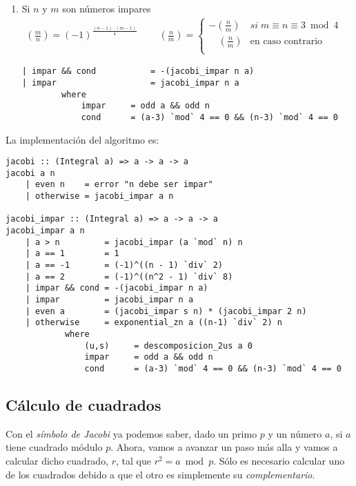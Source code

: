 \documentclass[10pt,spanish]{article}
\begin{document}
\begin{enumerate}[1.]
\begin{verbatim}
| a == 2 = (-1)^((n^2 - 1) `div` 8)
\end{verbatim}

\item Si $n$ y $m$ son números impares
\begin{equation*}
    \begin{aligned}
    \left( \frac{m}{n} \right) = (-1)^{\frac{(n-1)\cdot(m-1)}{4}} \qquad\ \left( \frac{n}{m} \right) = \begin{cases}
        - \left( \frac{n}{m} \right) & si \;m \equiv n \equiv 3 \bmod 4 \\
        \quad\left( \frac{n}{m} \right) & \text{en caso contrario}\\
        \end{cases}
    \end{aligned}
    \phantom{\hspace{18cm}}
\end{equation*}

\begin{verbatim}
| impar && cond           = -(jacobi_impar n a)
| impar                   = jacobi_impar n a
        where
            impar     = odd a && odd n 
            cond      = (a-3) `mod` 4 == 0 && (n-3) `mod` 4 == 0
\end{verbatim}
\end{enumerate}

La implementación del algoritmo es:

\begin{verbatim}
jacobi :: (Integral a) => a -> a -> a
jacobi a n
    | even n    = error "n debe ser impar"
    | otherwise = jacobi_impar a n

jacobi_impar :: (Integral a) => a -> a -> a
jacobi_impar a n
    | a > n         = jacobi_impar (a `mod` n) n
    | a == 1        = 1
    | a == -1       = (-1)^((n - 1) `div` 2)
    | a == 2        = (-1)^((n^2 - 1) `div` 8)
    | impar && cond = -(jacobi_impar n a)
    | impar         = jacobi_impar n a
    | even a        = (jacobi_impar s n) * (jacobi_impar 2 n)
    | otherwise     = exponential_zn a ((n-1) `div` 2) n
            where
                (u,s)     = descomposicion_2us a 0
                impar     = odd a && odd n 
                cond      = (a-3) `mod` 4 == 0 && (n-3) `mod` 4 == 0

\end{verbatim}

\subsection{\textcolor{rojo}Cálculo de cuadrados}
Con el \textit{\textcolor{rojo}{símbolo de Jacobi}} ya podemos saber, dado un primo $p$ y un número $a$, si $a$ tiene cuadrado módulo $p$. Ahora, vamos a avanzar un paso más alla y vamos a calcular dicho cuadrado, $r$, tal que $r^2 = a \bmod p$. Sólo es necesario calcular uno de los cuadrados debido a que el otro es simplemente su \textit{\textcolor{rojo}{complementario}}.
\end{document}
